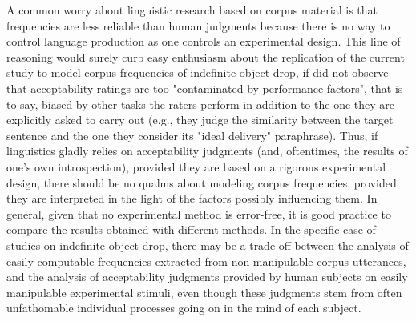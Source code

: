 A common worry about linguistic research based on corpus material is that frequencies are less reliable than human judgments because there is no way to control language production as one controls an experimental design. This line of reasoning would surely curb easy enthusiasm about the replication of the current study to model corpus frequencies of indefinite object drop, if \textcite{Steube2008, Schutze2016} did not observe that acceptability ratings are too "contaminated by performance factors", that is to say, biased by other tasks the raters perform in addition to the one they are explicitly asked to carry out (e.g., they judge the similarity between the target sentence and the one they consider its "ideal delivery" paraphrase). Thus, if linguistics gladly relies on acceptability judgments (and, oftentimes, the results of one's own introspection), provided they are based on a rigorous experimental design, there should be no qualms about modeling corpus frequencies, provided they are interpreted in the light of the factors possibly influencing them. In general, given that no experimental method is error-free, it is good practice to compare the results obtained with different methods. In the specific case of studies on indefinite object drop, there may be a trade-off between the analysis of easily computable frequencies extracted from non-manipulable corpus utterances, and the analysis of acceptability judgments provided by human subjects on easily manipulable experimental stimuli, even though these judgments stem from often unfathomable individual processes going on in the mind of each subject.\\
